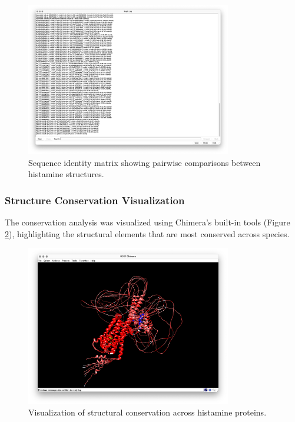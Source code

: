\documentclass[11pt, a4paper, hidelinks]{article}
\begin{document}
\begin{figure}[H]
    \centering
    \includegraphics[width=0.8\textwidth]{CAA84380.1/_img/seq identity results}
    \caption{Sequence identity matrix showing pairwise comparisons between histamine structures.}
    \label{fig:histamine-sequence-identity}
\end{figure}

\subsubsection{Structure Conservation Visualization}\label{subsubsec:histamine-conservation-vis}
The conservation analysis was visualized using Chimera's built-in tools (Figure \ref{fig:histamine-conservation-render}), highlighting the structural elements that are most conserved across species.

\begin{figure}[H]
    \centering
    \includegraphics[width=0.8\textwidth]{CAA84380.1/_img/conservation render}
    \caption{Visualization of structural conservation across histamine proteins.}
    \label{fig:histamine-conservation-render}
\end{figure}
\end{document}
